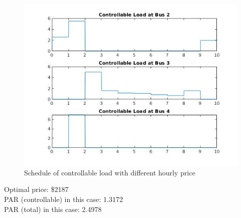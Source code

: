 \documentclass[11pt]{article}
\begin{document}
\begin{figure}[H]
    \centering
    \includegraphics[scale=0.6]{figs/q3.jpg}
    \caption{Schedule of controllable load with different hourly price}
    \label{fig::q3}
\end{figure}

\noindent
Optimal price: \$2187   \\
PAR (controllable) in this case: 1.3172    \\
PAR (total) in this case: 2.4978


\end{document}
